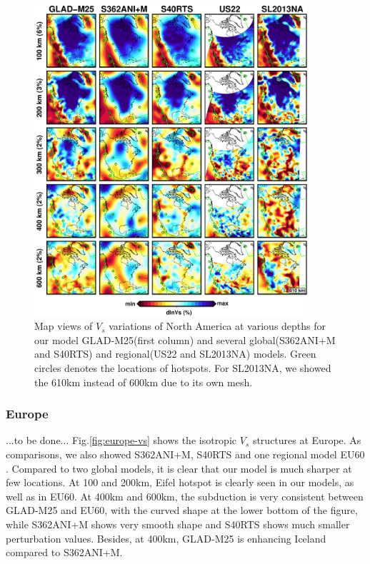 \documentclass[extra,mreferee]{gji}
\begin{document}
\begin{figure}
\centering
\includegraphics[width=0.9\textwidth]{figures/depth_slice/america_vs.pdf}
  \caption{Map views of $V_s$ variations of North America at various depths
  for our model GLAD-M25(first column) and several global(S362ANI+M and S40RTS)
  and regional(US22\citep{zhu2017radial} and SL2013NA\citep{schaeffer2014imaging})
  models. Green circles denotes the locations of hotspots. For SL2013NA, we
  showed the 610km instead of 600km due to its own mesh.}
\label{fig:america-vs}

\end{figure}

\subsubsection{Europe}

...to be done...
Fig.\ref{fig:europe-vs} shows the isotropic $V_s$ structures at Europe. As
comparisons, we also showed S362ANI+M, S40RTS and one regional model EU60
\citep{zhu2015seismic}. Compared to two global models, it is clear that
our model is much sharper at few locations. At 100 and 200km, Eifel
hotspot is clearly seen in our models, as well as in EU60. At 400km
and 600km, the subduction is very consistent between GLAD-M25 and EU60,
with the curved shape at the lower bottom of the figure,
while S362ANI+M shows very smooth shape and S40RTS shows much smaller 
perturbation values. Besides, at 400km, GLAD-M25 is enhancing Iceland
compared to S362ANI+M.
\end{document}
